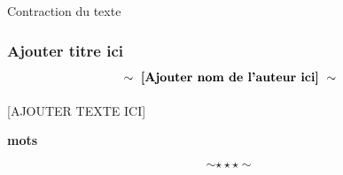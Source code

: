 \newpage \begin{bclogo}[barre=none,logo={}]{Contraction du texte} 
	\begin{center}
		\subsubsection*{Ajouter titre ici $$\sim\ \text{{\bfseries [Ajouter nom de l'auteur ici]}}\ \sim$$}
	\end{center}
\end{bclogo}
	\hspace*{0.5cm}
	[AJOUTER TEXTE ICI]
\begin{center}
	{\textbf{ mots}}
\end{center}
$$\sim\star\star\star\sim$$

